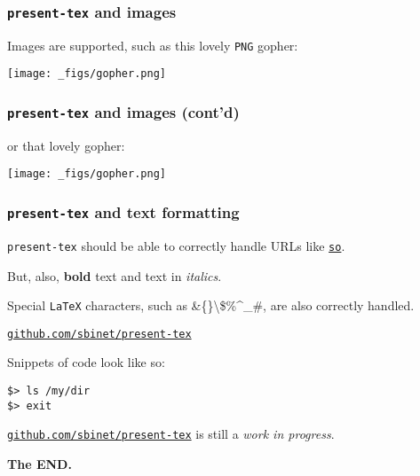 \documentclass[9pt]{beamer}
\newcommand{\myblue} [1] {{\color{blue}#1}}
\begin{document}
\begin{frame}[fragile]
\frametitle{\texttt{present-tex} and images}



Images are supported, such as this lovely \texttt{PNG} gopher:



\begin{center}
\texttt{[image: \_figs/gopher.png]}
\end{center}


\end{frame}

\begin{frame}[fragile]
\frametitle{\texttt{present-tex} and images (cont'd)}



or that lovely gopher:



\begin{center}
\texttt{[image: \_figs/gopher.png]}
\end{center}


\end{frame}

\begin{frame}[fragile]
\frametitle{\texttt{present-tex} and text formatting}



\texttt{present-tex} should be able to correctly handle URLs like
\myblue{\href{https://github.com/sbinet/present-tex}{\texttt{so}}}.




But, also, \textbf{bold} text and text in \emph{italics}.




Special \texttt{LaTeX} characters, such as \&\{\}\textbackslash\$\%\^{}\_\#, are also correctly handled.



\myblue{\href{https://github.com/sbinet/present-tex}{\texttt{github.com/sbinet/present-tex}}}


Snippets of code look like so:




\begin{verbatim}
$> ls /my/dir
$> exit

\end{verbatim}



\myblue{\href{https://github.com/sbinet/present-tex}{\texttt{github.com/sbinet/present-tex}}} is still a \emph{work in progress}.




\textbf{The END.}




\end{frame}
\end{document}
